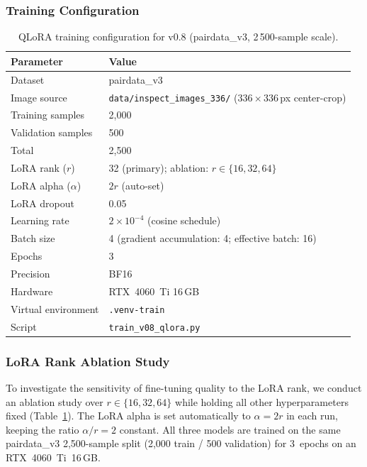 \documentclass[onecolumn]{article}
\begin{document}
\subsubsection*{Training Configuration}

\begin{table}[h]
\centering
\caption{QLoRA training configuration for v0.8 (pairdata\_v3, 2\,500-sample scale).}
\label{tab:u4_config}
\small
\begin{tabular}{ll}
\toprule
\textbf{Parameter} & \textbf{Value} \\
\midrule
Dataset & pairdata\_v3 \\
Image source & \texttt{data/inspect\_images\_336/} ($336\times336$\,px center-crop) \\
Training samples & 2{,}000 \\
Validation samples & 500 \\
Total & 2{,}500 \\
LoRA rank ($r$) & 32 (primary); ablation: $r \in \{16, 32, 64\}$ \\
LoRA alpha ($\alpha$) & $2r$ (auto-set) \\
LoRA dropout & 0.05 \\
Learning rate & $2\times10^{-4}$ (cosine schedule) \\
Batch size & 4 (gradient accumulation: 4; effective batch: 16) \\
Epochs & 3 \\
Precision & BF16 \\
Hardware & RTX~4060~Ti 16\,GB \\
Virtual environment & \texttt{.venv-train} \\
Script & \texttt{train\_v08\_qlora.py} \\
\bottomrule
\end{tabular}
\end{table}

\subsubsection*{LoRA Rank Ablation Study}

To investigate the sensitivity of fine-tuning quality to the LoRA rank,
we conduct an ablation study over $r \in \{16, 32, 64\}$ while holding all
other hyperparameters fixed (Table~\ref{tab:u4_config}).
The LoRA alpha is set automatically to $\alpha = 2r$ in each run,
keeping the ratio $\alpha/r = 2$ constant.
All three models are trained on the same pairdata\_v3 2{,}500-sample split
(2{,}000 train / 500 validation) for 3~epochs on an RTX~4060~Ti~16\,GB.
\end{document}
